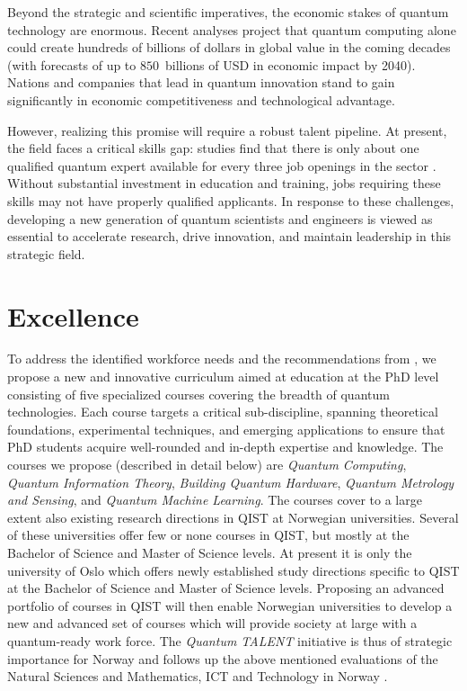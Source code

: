 \documentclass{scrreprt}
\begin{document}
Beyond the strategic and scientific imperatives, the economic stakes
of quantum technology are enormous. Recent analyses project that
quantum computing alone could create hundreds of billions of dollars
in global value in the coming decades \cite{forecast} (with forecasts of up to
$850$~billions of USD in economic impact by 2040). Nations and companies that
lead in quantum innovation stand to gain significantly in economic
competitiveness and technological advantage.

However, realizing this promise will require a robust talent
pipeline. At present, the field faces a critical skills gap: studies
find that there is only about one qualified quantum expert available
for every three job openings in the sector \cite{skillsgap}. Without substantial
investment in education and training, jobs requiring these skills may not have properly qualified applicants. In response to these challenges, %
developing a new generation of quantum
scientists and engineers is viewed as essential to accelerate
research, drive innovation, and maintain leadership in this strategic
field.



\section{Excellence}


To address the identified workforce needs and the recommendations from \cite{evalnat,evalmat}, we propose a new and innovative 
curriculum aimed at education at the PhD level consisting of five specialized courses covering the breadth of
quantum technologies. Each course targets a critical
sub-discipline, spanning theoretical foundations, experimental
techniques, and emerging applications to ensure that PhD students acquire
well-rounded and in-depth expertise and knowledge. The courses we propose (described in detail below) are
\textit{Quantum Computing}, \textit{Quantum Information Theory}, \textit{Building Quantum Hardware},
\textit{Quantum Metrology and Sensing}, and \textit{Quantum Machine Learning}. The courses cover to a large extent also existing research directions in QIST at Norwegian universities. Several of these universities offer few or none courses in QIST, but mostly at the Bachelor of Science and Master of Science levels. At present it is only the university of Oslo which offers newly established study directions specific to QIST at the Bachelor of Science  and Master of Science levels. Proposing an advanced portfolio of courses in QIST will then enable Norwegian  universities to develop a new and advanced set of courses which will provide society at large with a quantum-ready work force. The \textit{Quantum TALENT} initiative is thus of strategic importance for Norway and follows up the above mentioned evaluations of the Natural Sciences and Mathematics, ICT and Technology in Norway \cite{evalnat,evalmat}.
\end{document}
